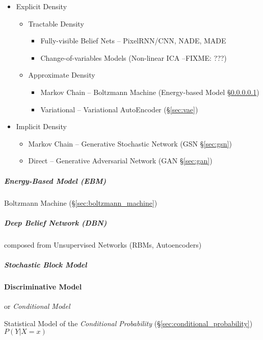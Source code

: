 \begin{itemize}
  \item Explicit Density
  \begin{itemize}
    \item Tractable Density
      \begin{itemize}
        \item Fully-visible Belief Nets -- PixelRNN/CNN, NADE, MADE
        \item Change-of-variables Models (Non-linear ICA --FIXME: ???)
      \end{itemize}
    \item Approximate Density
    \begin{itemize}
      \item Markov Chain -- Boltzmann Machine (Energy-based Model
        \S\ref{sec:ebm})
      \item Variational -- Variational AutoEncoder (\S\ref{sec:vae})
    \end{itemize}
  \end{itemize}
  \item Implicit Density
  \begin{itemize}
    \item Markov Chain -- Generative Stochastic Network (GSN \S\ref{sec:gsn})
    \item Direct -- Generative Adversarial Network (GAN \S\ref{sec:gan})
  \end{itemize}
\end{itemize}



\subparagraph{Energy-Based Model (EBM)}\label{sec:ebm}\hfill

Boltzmann Machine (\S\ref{sec:boltzmann_machine})



\subparagraph{Deep Belief Network (DBN)}\label{sec:dbn}\hfill

composed from Unsupervised Networks (RBMs, Autoencoders)



\subparagraph{Stochastic Block Model}\label{sec:stochastic_block_model}\hfill



\paragraph{Discriminative Model}\label{sec:discriminative_model}\hfill

or \emph{Conditional Model}

Statistical Model of the \emph{Conditional Probability}
(\S\ref{sec:conditional_probability}) $P(Y | X = x)$

